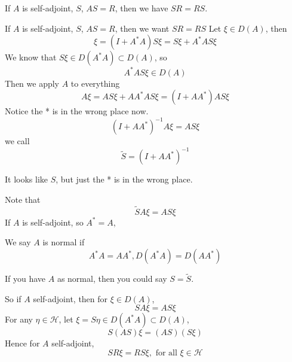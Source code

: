 \begin{theorem}
    If $A$ is self-adjoint, $S$, $AS=R$, then we have $SR=RS$. 
\end{theorem}
If $A$ is self-adjoint, $S$, $AS=R$, then we want
$SR=RS$ Let $\xi\in D(A)$, then
\begin{equation*}
    \xi=(I+A^*A)S\xi=S\xi+A^*AS\xi
\end{equation*}
We know that $S\xi\in D(A^*A)\subset D(A)$, so
\begin{equation*}
    A^*AS\xi\in D(A)
\end{equation*} 
Then we apply $A$ to everything
\begin{equation*}
    A\xi=AS\xi+AA^*AS\xi=(I+AA^*)AS\xi
\end{equation*}
Notice the * is in the wrong place now.
\begin{equation*}
    (I+AA^*)^{-1}A\xi=AS\xi
\end{equation*}
we call
\begin{equation*}
    \tilde{S}=(I+AA^*)^{-1}
\end{equation*}
\begin{note}
    It looks like $S$, but just the * is in the wrong place.
\end{note}
Note that 
\begin{equation*}
    \tilde{S}A\xi=AS\xi
\end{equation*}
If $A$ is self-adjoint, so $A^*=A$, \begin{definition}
    We say $A$ is normal if 
    \begin{equation*}
        A^*A=AA^*, D(A^*A)=D(AA^*)
    \end{equation*}
\end{definition}
If you have $A$ as normal, then you could say $S=\tilde{S}$.

So if $A$ self-adjoint, then for $\xi\in D(A)$, 
\begin{equation*}
    SA\xi=AS\xi
\end{equation*}
For any $\eta\in\mathcal{H}$, let $\xi=S\eta\in D(A^*A)\subset D(A)$, 
\begin{equation*}
    S(AS)\xi=(AS)(S\xi)
\end{equation*}
Hence for $A$ self-adjoint,
\begin{equation*}
    SR\xi=RS\xi, \text{ for all }\xi\in\mathcal{H}
\end{equation*}